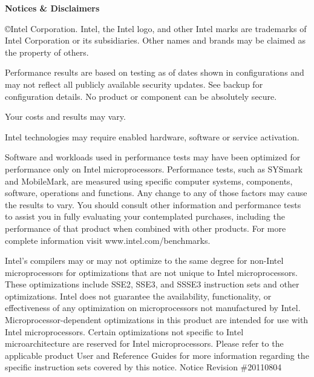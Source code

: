 \scriptsize
\begin{framed}
\noindent \textbf{Notices \& Disclaimers}


\copyright  Intel Corporation.  Intel, the Intel logo, and other Intel marks are 
trademarks of Intel Corporation or its subsidiaries.  
Other names and brands may be claimed as the property of others.


Performance results are based on testing as of dates shown in configurations 
and may not reflect all publicly available security updates.  
See backup for configuration details.  
No product or component can be absolutely secure. 


Your costs and results may vary. 


Intel technologies may require enabled hardware, software or service activation.


Software and workloads used in performance tests may have been optimized for 
performance only on Intel microprocessors.  
Performance tests, such as SYSmark and MobileMark, are measured using specific 
computer systems, components, software, operations and functions.  
Any change to any of those factors may cause the results to vary.  
You should consult other information and performance tests to assist you in 
fully evaluating your contemplated purchases, including the performance of 
that product when combined with other products.   
For more complete information visit www.intel.com/benchmarks.


Intel's compilers may or may not optimize to the same degree for non-Intel 
microprocessors for optimizations that are not unique to Intel microprocessors. 
These optimizations include SSE2, SSE3, and SSSE3 instruction sets and other optimizations. 
Intel does not guarantee the availability, functionality, or effectiveness of any 
optimization on microprocessors not manufactured by Intel. 
Microprocessor-dependent optimizations in this product are intended for use with 
Intel microprocessors. 
Certain optimizations not specific to Intel microarchitecture are reserved for Intel 
microprocessors. 
Please refer to the applicable product User and Reference Guides for more 
information regarding the specific instruction sets covered by this notice.  
Notice Revision \#20110804
\end{framed}
